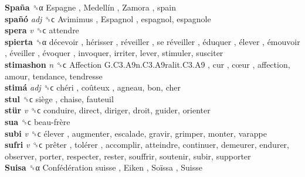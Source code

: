 \textbf{Spaña} ␝α   Espagne ,  Medellín ,  Zamora , spain  \\
\textbf{spañó} \emph{adj}  ␝ϲ   Avimimus ,  Espagnol , espagnol, espagnole  \\
\textbf{spera} \emph{v}  ␝ϲ  attendre  \\
\textbf{spierta} ␝α   décevoir ,  hérisser ,  réveiller ,  se réveiller ,  éduquer ,  élever ,  émouvoir ,  éveiller ,  évoquer , invoquer, irriter, lever, stimuler, susciter  \\
\textbf{stimashon} \emph{n}  ␝ϲ   Affection G.C3.A9n.C3.A9ralit.C3.A9 ,  cur ,  cœur , affection, amour, tendance, tendresse  \\
\textbf{stimá} \emph{adj}  ␝ϲ   chéri ,  coûteux , agneau, bon, cher  \\
\textbf{stul} ␝ϲ   siège , chaise, fauteuil  \\
\textbf{stür} \emph{v}  ␝ϲ  conduire, direct, diriger, droit, guider, orienter  \\
\textbf{sua} ␝ϲ   beau-frère   \\
\textbf{subi} \emph{v}  ␝ϲ   élever , augmenter, escalade, gravir, grimper, monter, varappe  \\
\textbf{sufri} \emph{v}  ␝ϲ   prêter ,  tolérer , accomplir, atteindre, continuer, demeurer, endurer, observer, porter, respecter, rester, souffrir, soutenir, subir, supporter  \\
\textbf{Suisa} ␝α   Confédération suisse ,  Eiken ,  Soïssa ,  Suisse   \\
